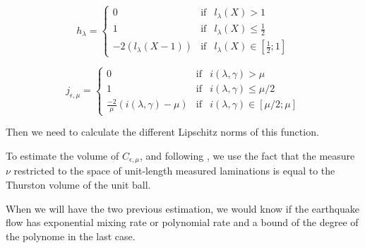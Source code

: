 $$
h_{\lambda} = \left \{
\begin{array}{lll}
0 & \text{if} & l_{\lambda}(X) > 1\\
1 & \text{if} & l_{\lambda}(X) \leq \frac{1}{2}\\
-2(l_\lambda(X -1)) & \text{if} & l_{\lambda}(X) \in [\frac{1}{2};1]
\end{array}
\right .
$$

$$
j_{\epsilon,\mu} = \left \{
\begin{array}{lll}
0 & \text{if} & i(\lambda,\gamma) > \mu\\
1 & \text{if} & i(\lambda,\gamma) \leq \mu/2\\
\frac{-2 }{\mu}(i(\lambda,\gamma)-\mu) & \text{if} & i(\lambda,\gamma) \in [\mu/2; \mu]
\end{array}
\right .
$$

Then we need to calculate the different Lipschitz norms of this function.

To estimate the volume of $C_{\epsilon,\mu}$, and following \cite{fu2015cusp}, we use the fact that the measure $\nu$ restricted to the space of unit-length measured laminations is equal to the Thurston volume of the unit ball.

When we will have the two previous estimation, we would know if the earthquake flow has exponential mixing rate or polynomial rate and a bound of the degree of the polynome in the last case. 
